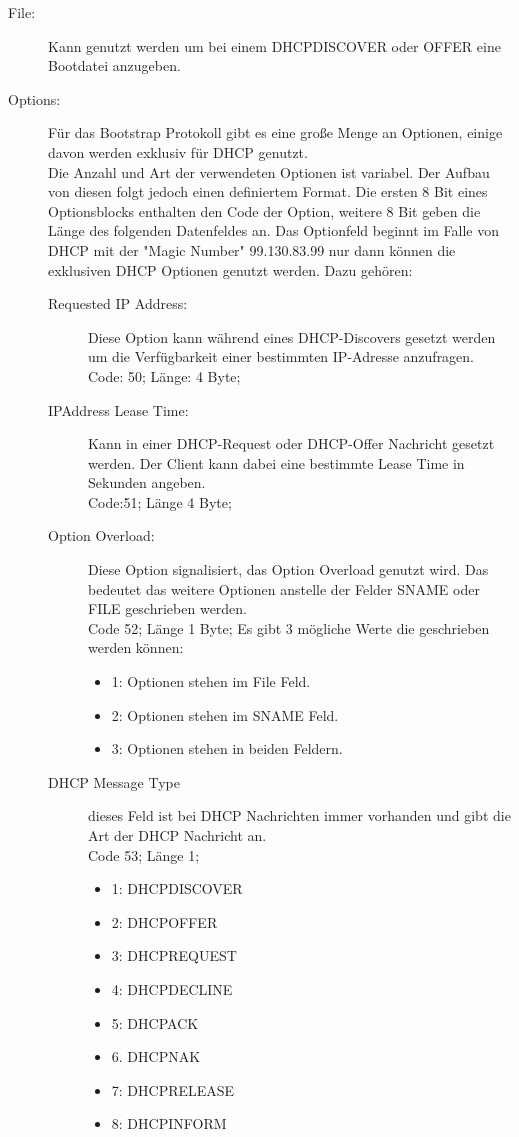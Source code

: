\begin{description}
\item[File: ] Kann genutzt werden um bei einem DHCPDISCOVER oder OFFER eine Bootdatei anzugeben. 
\item[Options: ] Für das Bootstrap Protokoll gibt es eine große Menge an Optionen, einige davon werden exklusiv für DHCP genutzt. \\
Die Anzahl und Art der verwendeten Optionen ist variabel. Der Aufbau von diesen folgt jedoch einen definiertem Format. Die ersten 8 Bit eines Optionsblocks enthalten den Code der Option, weitere 8 Bit geben die Länge des folgenden Datenfeldes an. Das Optionfeld beginnt im Falle von DHCP mit der {}"Magic Number"{} 99.130.83.99 nur dann können die exklusiven DHCP Optionen genutzt werden.
Dazu gehören:
\begin{description}
	\item[Requested IP Address:] Diese Option kann während eines DHCP-Discovers gesetzt werden um die Verfügbarkeit einer bestimmten IP-Adresse anzufragen.\\
	Code: 50; Länge: 4 Byte;
	 
	\item[IPAddress Lease Time:] Kann in einer DHCP-Request oder DHCP-Offer Nachricht gesetzt werden. Der Client kann dabei eine bestimmte Lease Time in Sekunden angeben.\\
	Code:51; Länge 4 Byte;
	
	\item[Option Overload:] Diese Option signalisiert, das Option Overload genutzt wird. Das bedeutet das weitere Optionen anstelle der Felder SNAME oder FILE geschrieben werden. \\
	Code 52; Länge 1 Byte;
	Es gibt 3 mögliche Werte die geschrieben werden können: 
	\begin{itemize}
		\item 1: Optionen stehen im File Feld. 
		\item 2: Optionen stehen im SNAME Feld.
		\item 3: Optionen stehen in beiden Feldern.
	\end{itemize}
	
	\item[DHCP Message Type] dieses Feld ist bei DHCP Nachrichten immer vorhanden und gibt die Art der DHCP Nachricht an. \\
	Code 53; Länge 1;
	\begin{itemize}
		\item 1: DHCPDISCOVER
		\item 2: DHCPOFFER
		\item 3: DHCPREQUEST
		\item 4: DHCPDECLINE
		\item 5: DHCPACK
		\item 6. DHCPNAK
		\item 7: DHCPRELEASE
		\item 8: DHCPINFORM		
		

\end{itemize}
\end{description}
\end{description}
